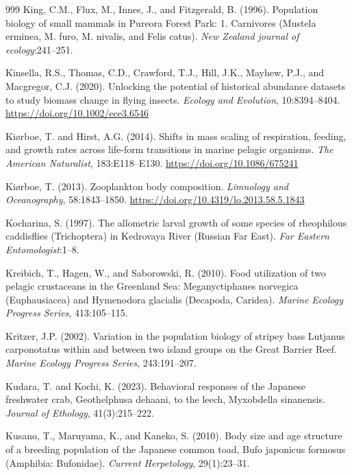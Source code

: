 \begin{thebibliography}{999}
King, C.M., Flux, M., Innes, J., and Fitzgerald, B. (1996). Population biology of small mammals in Pureora Forest Park: 1. Carnivores (Mustela erminea, M. furo, M. nivalis, and Felis catus). \textit{New Zealand journal of ecology}:241--251.

Kinsella, R.S., Thomas, C.D., Crawford, T.J., Hill, J.K., Mayhew, P.J., and Macgregor, C.J. (2020). Unlocking the potential of historical abundance datasets to study biomass change in flying insects. \textit{Ecology and Evolution}, 10:8394--8404. \url{https://doi.org/10.1002/ece3.6546}

Ki{\o}rboe, T. and Hirst, A.G. (2014). Shifts in mass scaling of respiration, feeding, and growth rates across life-form transitions in marine pelagic organisms. \textit{The American Naturalist}, 183:E118--E130. \url{https://doi.org/10.1086/675241}

Ki{\o}rboe, T. (2013). Zooplankton body composition. \textit{Limnology and Oceanography}, 58:1843--1850. \url{https://doi.org/10.4319/lo.2013.58.5.1843}

Kocharina, S. (1997). The allometric larval growth of some species of rheophilous caddisflies (Trichoptera) in Kedrovaya River (Russian Far East). \textit{Far Eastern Entomologist}:1--8.

Kreibich, T., Hagen, W., and Saborowski, R. (2010). Food utilization of two pelagic crustaceans in the Greenland Sea: Meganyctiphanes norvegica (Euphausiacea) and Hymenodora glacialis (Decapoda, Caridea). \textit{Marine Ecology Progress Series}, 413:105--115.

Kritzer, J.P. (2002). Variation in the population biology of stripey bass Lutjanus carponotatus within and between two island groups on the Great Barrier Reef. \textit{Marine Ecology Progress Series}, 243:191--207.

Kudara, T. and Kochi, K. (2023). Behavioral responses of the Japanese freshwater crab, Geothelphusa dehaani, to the leech, Myxobdella sinanensis. \textit{Journal of Ethology}, 41(3):215--222.

Kusano, T., Maruyama, K., and Kaneko, S. (2010). Body size and age structure of a breeding population of the Japanese common toad, Bufo japonicus formosus (Amphibia: Bufonidae). \textit{Current Herpetology}, 29(1):23--31.


\end{thebibliography}
